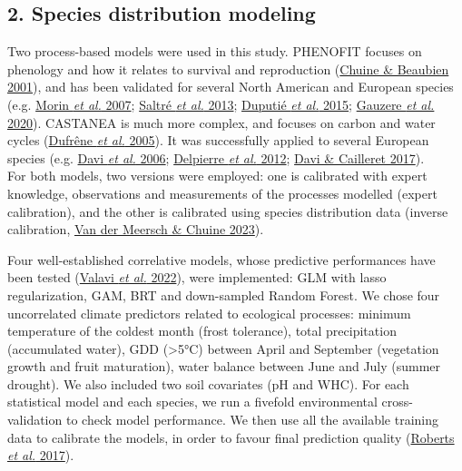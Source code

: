 \documentclass[11pt,]{article}
\begin{document}
\hypertarget{species-distribution-modeling}{%
\subsection{2. Species distribution
modeling}\label{species-distribution-modeling}}

Two process-based models were used in this study. PHENOFIT focuses on
phenology and how it relates to survival and reproduction
(\protect\hyperlink{ref-Chuine2001}{Chuine \& Beaubien 2001}), and has
been validated for several North American and European species (e.g.
\protect\hyperlink{ref-Morin2007}{Morin \emph{et al.} 2007};
\protect\hyperlink{ref-Saltre2013}{Saltré \emph{et al.} 2013};
\protect\hyperlink{ref-Duputie2015}{Duputié \emph{et al.} 2015};
\protect\hyperlink{ref-Gauzere2020}{Gauzere \emph{et al.} 2020}).
CASTANEA is much more complex, and focuses on carbon and water cycles
(\protect\hyperlink{ref-Dufrene2005}{Dufrêne \emph{et al.} 2005}). It
was successfully applied to several European species (e.g.
\protect\hyperlink{ref-Davi2006}{Davi \emph{et al.} 2006};
\protect\hyperlink{ref-Delpierre2012}{Delpierre \emph{et al.} 2012};
\protect\hyperlink{ref-Davi2017}{Davi \& Cailleret 2017}).\\
For both models, two versions were employed: one is calibrated with
expert knowledge, observations and measurements of the processes
modelled (expert calibration), and the other is calibrated using species
distribution data (inverse calibration,
\protect\hyperlink{ref-VanderMeersch2023}{Van der Meersch \& Chuine
2023}).

Four well-established correlative models, whose predictive performances
have been tested (\protect\hyperlink{ref-Valavi2022}{Valavi \emph{et
al.} 2022}), were implemented: GLM with lasso regularization, GAM, BRT
and down-sampled Random Forest. We chose four uncorrelated climate
predictors related to ecological processes: minimum temperature of the
coldest month (frost tolerance), total precipitation (accumulated
water), GDD (\textgreater5°C) between April and September (vegetation
growth and fruit maturation), water balance between June and July
(summer drought). We also included two soil covariates (pH and WHC). For
each statistical model and each species, we run a fivefold environmental
cross-validation to check model performance. We then use all the
available training data to calibrate the models, in order to favour
final prediction quality (\protect\hyperlink{ref-Roberts2017}{Roberts
\emph{et al.} 2017}).
\end{document}
